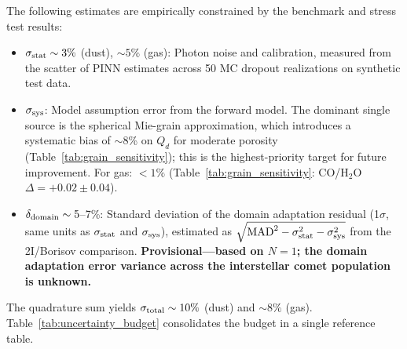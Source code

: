 \documentclass[usenatbib]{mnras}
\begin{document}
The following estimates are empirically constrained by the benchmark and stress test results:

\begin{itemize}
    \item $\sigma_{\rm stat} \sim 3\%$ (dust), $\sim 5\%$ (gas): Photon noise and calibration, measured from the scatter of PINN estimates across 50 MC dropout realizations on synthetic test data.
    \item $\sigma_{\rm sys}$: Model assumption error from the forward model. The dominant single source is the spherical Mie-grain approximation, which introduces a systematic bias of $\sim$8\% on $Q_d$ for moderate porosity (Table~\ref{tab:grain_sensitivity}); this is the highest-priority target for future improvement. For gas: $<1\%$ (Table~\ref{tab:grain_sensitivity}: CO/H$_2$O $\Delta = +0.02 \pm 0.04$).
    \item $\delta_{\rm domain} \sim 5$--7\%: Standard deviation of the domain adaptation residual (1$\sigma$, same units as $\sigma_{\rm stat}$ and $\sigma_{\rm sys}$), estimated as $\sqrt{\text{MAD}^2 - \sigma_{\rm stat}^2 - \sigma_{\rm sys}^2}$ from the 2I/Borisov comparison. \textbf{Provisional---based on $N=1$; the domain adaptation error variance across the interstellar comet population is unknown.}
\end{itemize}

The quadrature sum yields $\sigma_{\rm total} \sim 10\%$ (dust) and $\sim 8\%$ (gas). Table~\ref{tab:uncertainty_budget} consolidates the budget in a single reference table.
\end{document}

